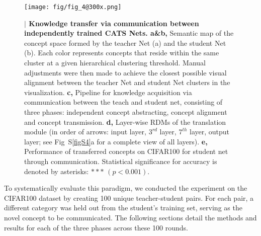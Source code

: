\documentclass[pdflatex,sn-mathphys-num,lineno]{sn-jnl}%
\begin{document}
\begin{CJK}{UTF8}{gbsn}
\begin{figure}[htbp]
\centering
\texttt{[image: fig/fig\_4@300x.png]}
\caption{\textbf{$\vert$ Knowledge transfer via communication between independently trained CATS Nets. a\&b,} Semantic map of the concept space formed by the teacher Net (a) and the student Net (b). Each color represents concepts that reside within the same cluster at a given hierarchical clustering threshold. Manual adjustments were then made to achieve the closest possible visual alignment between the teacher Net and student Net clusters in the visualization. \textbf{c,} Pipeline for knowledge acquisition via communication between the teach and student net, consisting of three phases: independent concept abstracting, concept alignment and concept transmission. \textbf{d,} Layer-wise RDMs of the translation module (in order of arrows: input layer, $3^{rd}$ layer, $7^{th}$ layer, output layer; see Fig~S\ref{figS4}a for a complete view of all layers). \textbf{e,} Performance of transferred concepts on CIFAR100 for student net through communication. Statistical significance for accuracy is denoted by asterisks: $***$ $(p < 0.001)$.}
\label{fig4}
\end{figure}

To systematically evaluate this paradigm, we conducted the experiment on the CIFAR100 dataset by creating 100 unique teacher-student pairs. For each pair, a different category was held out from the student's training set, serving as the novel concept to be communicated. The following sections detail the methods and results for each of the three phases across these 100 rounds.


\end{CJK}
\end{document}
